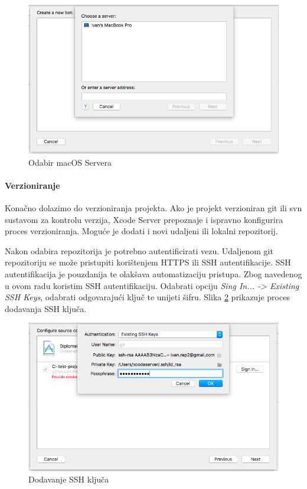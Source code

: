 \documentclass[times, utf8, diplomski, numeric]{fer}
\begin{document}
\begin{appendices}
\begin{figure}
\centering
\includegraphics[scale=0.4]{BotServerSelection}
\caption{Odabir macOS Servera}
\label{fig:BotServerSelection}
\end{figure}

\paragraph{Verzioniranje}

Konačno dolazimo do verzioniranja projekta. Ako je projekt verzioniran git ili svn sustavom za kontrolu verzija, Xcode Server prepoznaje i ispravno konfigurira proces verzioniranja. Moguće je dodati i novi udaljeni ili lokalni repozitorij.

Nakon odabira repozitorija je potrebno autentificirati vezu. Udaljenom git repozitoriju se može pristupiti korištenjem HTTPS ili SSH autentifikacije. SSH autentifikacija je pouzdanija te olakšava automatizaciju pristupa. Zbog navedenog u ovom radu koristim SSH autentifikaciju. Odabrati opciju \textit{Sing In... -> Existing SSH Keys}, odabrati odgovarajući ključ te unijeti šifru. Slika \ref{fig:BotAddingSSH} prikazuje proces dodavanja SSH ključa.

\begin{figure}[b!]
\centering
\includegraphics[scale=0.4]{BotAddingSSH}
\caption{Dodavanje SSH ključa}
\label{fig:BotAddingSSH}
\end{figure}


\end{appendices}
\end{document}
